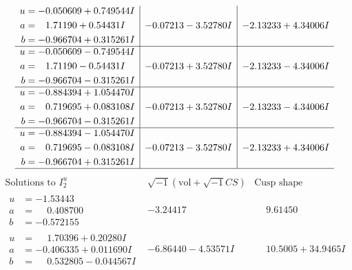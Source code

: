\documentclass[1p]{elsarticle_modified}
\theoremstyle{definition}
\newcommand{\I}{\sqrt{-1}}
\begin{document}
$$\begin{array}{c|c|c}
\begin{aligned}
u &= -0.050609 + 0.749544 I \\
a &= \phantom{-}1.71190 + 0.54431 I \\
b &= -0.966704 + 0.315261 I\end{aligned}
 & -0.07213 - 3.52780 I & -2.13233 + 4.34006 I \\ \hline\begin{aligned}
u &= -0.050609 - 0.749544 I \\
a &= \phantom{-}1.71190 - 0.54431 I \\
b &= -0.966704 - 0.315261 I\end{aligned}
 & -0.07213 + 3.52780 I & -2.13233 - 4.34006 I \\ \hline\begin{aligned}
u &= -0.884394 + 1.054470 I \\
a &= \phantom{-}0.719695 + 0.083108 I \\
b &= -0.966704 - 0.315261 I\end{aligned}
 & -0.07213 + 3.52780 I & -2.13233 - 4.34006 I \\ \hline\begin{aligned}
u &= -0.884394 - 1.054470 I \\
a &= \phantom{-}0.719695 - 0.083108 I \\
b &= -0.966704 + 0.315261 I\end{aligned}
 & -0.07213 - 3.52780 I & -2.13233 + 4.34006 I\\
 \hline 
 \end{array}$$\newpage$$\begin{array}{c|c|c}  
\text{Solutions to }I^u_{2}& \I (\text{vol} + \sqrt{-1}CS) & \text{Cusp shape}\\
 \hline 
\begin{aligned}
u &= -1.53443\phantom{ +0.000000I} \\
a &= \phantom{-}0.408700\phantom{ +0.000000I} \\
b &= -0.572155\phantom{ +0.000000I}\end{aligned}
 & -3.24417\phantom{ +0.000000I} & \phantom{-}9.61450\phantom{ +0.000000I} \\ \hline\begin{aligned}
u &= \phantom{-}1.70396 + 0.20280 I \\
a &= -0.406335 + 0.011690 I \\
b &= \phantom{-}0.532805 - 0.044567 I\end{aligned}
 & -6.86440 - 4.53571 I & \phantom{-}10.5005 + 34.9465 I \\ \hline\begin{aligned}

\end{aligned}
\end{array}$$
\end{document}
